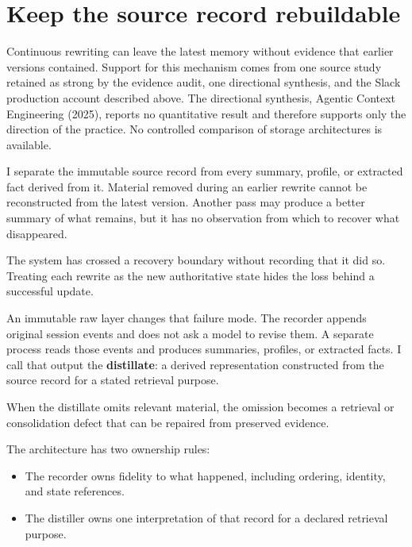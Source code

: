\hypertarget{keep-the-source-record-rebuildable}{%
\section{Keep the source record rebuildable}\label{keep-the-source-record-rebuildable}}

Continuous rewriting can leave the latest memory without evidence that earlier versions contained. Support for this mechanism comes from one source study retained as strong by the evidence audit, one directional synthesis, and the Slack production account described above. The directional synthesis, Agentic Context Engineering (2025), reports no quantitative result and therefore supports only the direction of the practice. No controlled comparison of storage architectures is available.

I separate the immutable source record from every summary, profile, or extracted fact derived from it. Material removed during an earlier rewrite cannot be reconstructed from the latest version. Another pass may produce a better summary of what remains, but it has no observation from which to recover what disappeared.

The system has crossed a recovery boundary without recording that it did so. Treating each rewrite as the new authoritative state hides the loss behind a successful update.

An immutable raw layer changes that failure mode. The recorder appends original session events and does not ask a model to revise them. A separate process reads those events and produces summaries, profiles, or extracted facts. I call that output the \textbf{distillate}: a derived representation constructed from the source record for a stated retrieval purpose.

When the distillate omits relevant material, the omission becomes a retrieval or consolidation defect that can be repaired from preserved evidence.


The architecture has two ownership rules:

\begin{itemize}
\tightlist
\item
  The recorder owns fidelity to what happened, including ordering, identity, and state references.
\item
  The distiller owns one interpretation of that record for a declared retrieval purpose.
\end{itemize}

